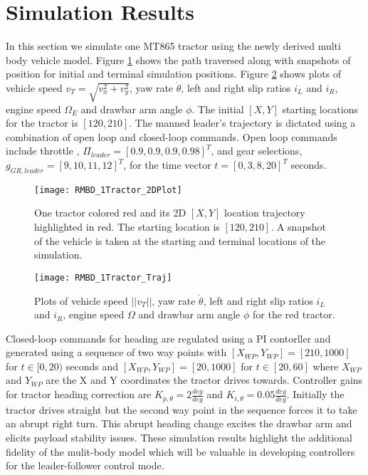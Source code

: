 \section{Simulation Results}
In this section we simulate one MT865 tractor using the newly derived multi body vehicle model. Figure \ref{fig:MB_Tractor_2D_Plot} shows the path traversed along with snapshots of position for initial and terminal simulation positions. Figure \ref{fig:MB_Tractor_traj} shows plots of vehicle speed $v_T = \sqrt{v_x^2 + v_y^2}$, yaw rate $\dot\theta$, left and right slip ratios $i_L$ and $i_R$, engine speed $\Omega_E$ and drawbar arm angle $\phi$. The initial $[X,Y]$ starting locations for the tractor is $[120, 210]$. The manned leader's trajectory is dictated using a combination of open loop and closed-loop commands. Open loop commands include throttle , $\Pi_{leader} = [0.9, 0.9  ,0.9, 0.98]^T$, and gear selections, $g_{GR,leader} = [ 9 , 10 , 11 , 12]^T$, for the time vector $t = [0 , 3 , 8 , 20]^T$ seconds. 
\begin{figure}[htbp]
    \centering
    \vspace{-15pt}
    \texttt{[image: RMBD\_1Tractor\_2DPlot]}
    \caption{One tractor colored red and its 2D $[X, Y]$ location trajectory highlighted in red. The starting location is $[120, 210]$. A snapshot of the vehicle is taken at the starting and terminal locations of the simulation.}
    \label{fig:MB_Tractor_2D_Plot}
\end{figure}
\begin{figure}[htbp]
    \centering
    \texttt{[image: RMBD\_1Tractor\_Traj]}
     \vspace{-5pt}
    \caption{Plots of vehicle speed $||v_T||$, yaw rate $\dot\theta$, left and right slip ratios $i_L$ and $i_R$, engine speed $\Omega$ and drawbar arm angle $\phi$ for the red tractor.}
     \vspace{-5pt}
    \label{fig:MB_Tractor_traj}
\end{figure} 
Closed-loop commands for heading are regulated using a PI contorller and generated using a sequence of two way points with $[X_{WP},Y_{WP}] = [210,1000]$ for $ t \in [0,20)$ seconds and $[X_{WP},Y_{WP}] = [20,1000]$ for $ t \in [20,60]$ where $X_{WP}$ and $Y_{WP}$ are the X and Y coordinates the tractor drives towards. Controller gains for tractor heading correction are $K_{p,\theta} = 2\frac{deg}{deg}$ and $K_{i,\theta} = 0.05\frac{deg}{deg}$. Initially the tractor drives straight but the second way point in the sequence forces it to take an abrupt right turn. This abrupt heading change excites the drawbar arm and elicits payload stability issues. These simulation results highlight the additional fidelity of the mulit-body model which will be valuable in developing controllers for the leader-follower control mode.
